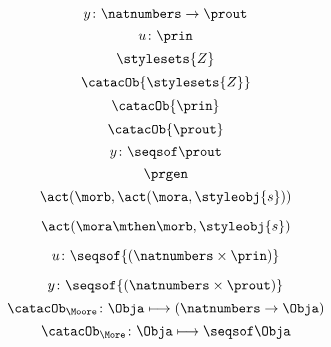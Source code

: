 {\begin{forslides}
%
        \begin{equation}
            \label{eq:prgen-y-1}
            y\colon \natnumbers \to \prout
        \end{equation}
%
        \begin{equation}
            \label{eq:prgen-u-2}
            u\colon \prin
        \end{equation}
%
        \begin{equation}
            \label{eq:Z}
            \stylesets{Z}
        \end{equation}
%
        \begin{equation}
            \label{eq:Za}
            \catacOb{\stylesets{Z}}
        \end{equation}
%
        \begin{equation}
            \label{eq:Ua}
            \catacOb{\prin}
        \end{equation}
%
        \begin{equation}
            \label{eq:Ya}
            \catacOb{\prout}
        \end{equation}
%
        \begin{equation}
            \label{eq:prgen-y-2}
            y\colon \seqsof  \prout
        \end{equation}
%
        \begin{equation}
            \label{eq:prgen}
            \prgen
        \end{equation}
%
        \begin{equation}
            \label{eq:now1}
            \act(\morb, \act(\mora, \styleobj{s}))
        \end{equation}
        
        
        \begin{equation}
            \label{eq:now2}
            \act(\mora\mthen\morb, \styleobj{s})
        \end{equation}
        
        \begin{equation}
            \label{eq:ev-sign}
            u\colon \seqsof{(\natnumbers \times \prin)}
        \end{equation}
        
        \begin{equation}
            \label{eq:ev-sign2}
            y\colon \seqsof{(\natnumbers \times \prout)}
        \end{equation}
        \begin{equation}
            \label{eq:phi-moore}
            {\catacOb_{\Moore}}\colon{\Obja}\longmapsto{(\natnumbers \to \Obja)}
        \end{equation}
        \begin{equation}
            \label{eq:phi-more}
            {\catacOb_{\More}}\colon{\Obja}\longmapsto{\seqsof \Obja}
        \end{equation}
    \end{forslides}
}
